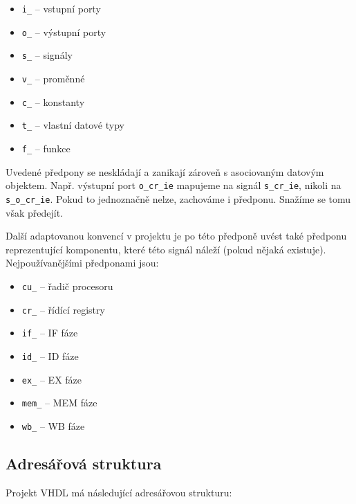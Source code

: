 \documentclass[
  digital, %
  color,   %
  table,   %
  twoside, %
  nolof,   %
  nolot,   %
]{fithesis3}
\begin{document}
\begin{itemize}
    \item \texttt{i\_} -- vstupní porty
    \item \texttt{o\_} -- výstupní porty
    \item \texttt{s\_} -- signály
    \item \texttt{v\_} -- proměnné
    \item \texttt{c\_} -- konstanty
    \item \texttt{t\_} -- vlastní datové typy
    \item \texttt{f\_} -- funkce
\end{itemize}

Uvedené předpony se neskládají a zanikají zároveň s asociovaným datovým objektem. Např. výstupní port \texttt{o\_cr\_ie} mapujeme na signál \texttt{s\_cr\_ie}, nikoli na \texttt{s\_o\_cr\_ie}. Pokud to jednoznačně nelze, zachováme i předponu. Snažíme se tomu však předejít.

Další adaptovanou konvencí v projektu je po této předponě uvést také předponu reprezentující komponentu, které této signál náleží (pokud nějaká existuje). Nejpoužívanějšími předponami jsou:

\begin{itemize}
    \item \texttt{cu\_} -- řadič procesoru
    \item \texttt{cr\_} -- řídící registry
    \item \texttt{if\_} -- IF fáze
    \item \texttt{id\_} -- ID fáze
    \item \texttt{ex\_} -- EX fáze
    \item \texttt{mem\_} -- MEM fáze
    \item \texttt{wb\_} -- WB fáze
\end{itemize}

\subsection{Adresářová struktura}
Projekt VHDL má následující adresářovou strukturu: \medskip

\end{document}
